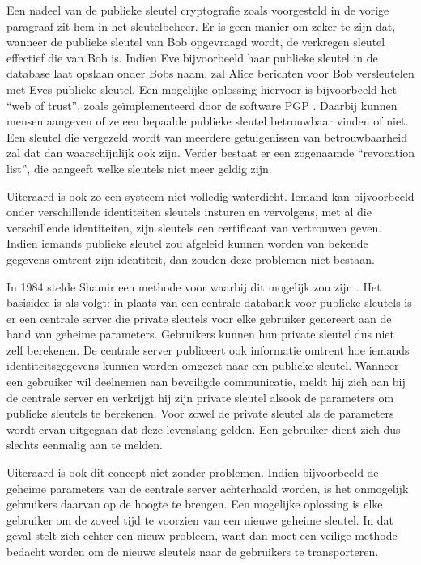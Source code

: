 Een nadeel van de publieke sleutel cryptografie zoals voorgesteld in de vorige paragraaf zit hem in het sleutelbeheer. Er is geen manier om zeker te zijn dat, wanneer de publieke sleutel van Bob opgevraagd wordt, de verkregen sleutel effectief die van Bob is. Indien Eve bijvoorbeeld haar publieke sleutel in de database laat opslaan onder Bobs naam, zal Alice berichten voor Bob versleutelen met Eves publieke sleutel. Een mogelijke oplossing hiervoor is bijvoorbeeld het ``web of trust'', zoals ge\"implementeerd door de software PGP \cite{pgp}. Daarbij kunnen mensen aangeven of ze een bepaalde publieke sleutel betrouwbaar vinden of niet. Een sleutel die vergezeld wordt van meerdere getuigenissen van betrouwbaarheid zal dat dan waarschijnlijk ook zijn. Verder bestaat er een zogenaamde ``revocation list'', die aangeeft welke sleutels niet meer geldig zijn.

Uiteraard is ook zo een systeem niet volledig waterdicht. Iemand kan bijvoorbeeld onder verschillende identiteiten sleutels insturen en vervolgens, met al die verschillende identiteiten, zijn sleutels een certificaat van vertrouwen geven. Indien iemands publieke sleutel zou afgeleid kunnen worden van bekende gegevens omtrent zijn identiteit, dan zouden deze problemen niet bestaan.

In 1984 stelde Shamir een methode voor waarbij dit mogelijk zou zijn \cite{shamir}. Het basisidee is als volgt: in plaats van een centrale databank voor publieke sleutels is er een centrale server die private sleutels voor elke gebruiker genereert aan de hand van geheime parameters. Gebruikers kunnen hun private sleutel dus niet zelf berekenen. De centrale server publiceert ook informatie omtrent hoe iemands identiteitsgegevens kunnen worden omgezet naar een publieke sleutel. Wanneer een gebruiker wil deelnemen aan beveiligde communicatie, meldt hij zich aan bij de centrale server en verkrijgt hij zijn private sleutel alsook de parameters om publieke sleutels te berekenen. Voor zowel de private sleutel als de parameters wordt ervan uitgegaan dat deze levenslang gelden. Een gebruiker dient zich dus slechts eenmalig aan te melden.

Uiteraard is ook dit concept niet zonder problemen. Indien bijvoorbeeld de geheime parameters van de centrale server achterhaald worden, is het onmogelijk gebruikers daarvan op de hoogte te brengen. Een mogelijke oplossing is elke gebruiker om de zoveel tijd te voorzien van een nieuwe geheime sleutel. In dat geval stelt zich echter een nieuw probleem, want dan moet een veilige methode bedacht worden om de nieuwe sleutels naar de gebruikers te transporteren.

